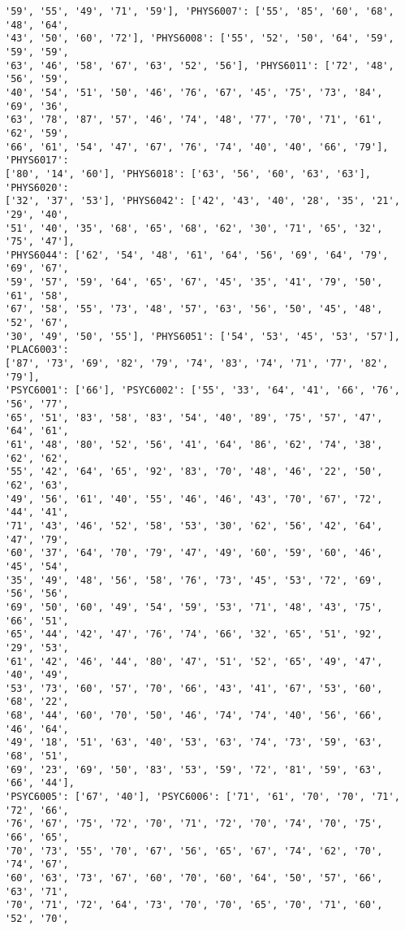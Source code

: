 \documentclass[11pt]{article}
\begin{document}
\begin{Verbatim}[commandchars=\\\{\}]
'59', '55', '49', '71', '59'], 'PHYS6007': ['55', '85', '60', '68', '48', '64',
'43', '50', '60', '72'], 'PHYS6008': ['55', '52', '50', '64', '59', '59', '59',
'63', '46', '58', '67', '63', '52', '56'], 'PHYS6011': ['72', '48', '56', '59',
'40', '54', '51', '50', '46', '76', '67', '45', '75', '73', '84', '69', '36',
'63', '78', '87', '57', '46', '74', '48', '77', '70', '71', '61', '62', '59',
'66', '61', '54', '47', '67', '76', '74', '40', '40', '66', '79'], 'PHYS6017':
['80', '14', '60'], 'PHYS6018': ['63', '56', '60', '63', '63'], 'PHYS6020':
['32', '37', '53'], 'PHYS6042': ['42', '43', '40', '28', '35', '21', '29', '40',
'51', '40', '35', '68', '65', '68', '62', '30', '71', '65', '32', '75', '47'],
'PHYS6044': ['62', '54', '48', '61', '64', '56', '69', '64', '79', '69', '67',
'59', '57', '59', '64', '65', '67', '45', '35', '41', '79', '50', '61', '58',
'67', '58', '55', '73', '48', '57', '63', '56', '50', '45', '48', '52', '67',
'30', '49', '50', '55'], 'PHYS6051': ['54', '53', '45', '53', '57'], 'PLAC6003':
['87', '73', '69', '82', '79', '74', '83', '74', '71', '77', '82', '79'],
'PSYC6001': ['66'], 'PSYC6002': ['55', '33', '64', '41', '66', '76', '56', '77',
'65', '51', '83', '58', '83', '54', '40', '89', '75', '57', '47', '64', '61',
'61', '48', '80', '52', '56', '41', '64', '86', '62', '74', '38', '62', '62',
'55', '42', '64', '65', '92', '83', '70', '48', '46', '22', '50', '62', '63',
'49', '56', '61', '40', '55', '46', '46', '43', '70', '67', '72', '44', '41',
'71', '43', '46', '52', '58', '53', '30', '62', '56', '42', '64', '47', '79',
'60', '37', '64', '70', '79', '47', '49', '60', '59', '60', '46', '45', '54',
'35', '49', '48', '56', '58', '76', '73', '45', '53', '72', '69', '56', '56',
'69', '50', '60', '49', '54', '59', '53', '71', '48', '43', '75', '66', '51',
'65', '44', '42', '47', '76', '74', '66', '32', '65', '51', '92', '29', '53',
'61', '42', '46', '44', '80', '47', '51', '52', '65', '49', '47', '40', '49',
'53', '73', '60', '57', '70', '66', '43', '41', '67', '53', '60', '68', '22',
'68', '44', '60', '70', '50', '46', '74', '74', '40', '56', '66', '46', '64',
'49', '18', '51', '63', '40', '53', '63', '74', '73', '59', '63', '68', '51',
'69', '23', '69', '50', '83', '53', '59', '72', '81', '59', '63', '66', '44'],
'PSYC6005': ['67', '40'], 'PSYC6006': ['71', '61', '70', '70', '71', '72', '66',
'76', '67', '75', '72', '70', '71', '72', '70', '74', '70', '75', '66', '65',
'70', '73', '55', '70', '67', '56', '65', '67', '74', '62', '70', '74', '67',
'60', '63', '73', '67', '60', '70', '60', '64', '50', '57', '66', '63', '71',
'70', '71', '72', '64', '73', '70', '70', '65', '70', '71', '60', '52', '70',

\end{Verbatim}
\end{document}
